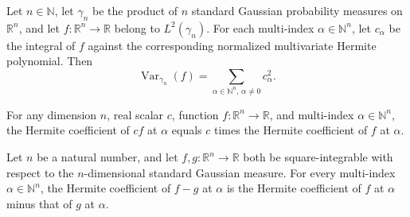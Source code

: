 \begin{theorem}
\label{BooleanAnalysis.GaussianSpace.variance_eq_hermite}
\leanok
{}
Let $n\in\mathbb N$, let $\gamma_n$ be the product of $n$ standard Gaussian probability
measures on $\mathbb R^n$, and let $f:\mathbb R^n\to\mathbb R$ belong to
$L^2(\gamma_n)$. For each multi-index $\alpha\in\mathbb N^n$, let $c_\alpha$ be the
integral of $f$ against the corresponding normalized multivariate Hermite polynomial.
Then
\[
\operatorname{Var}_{\gamma_n}(f)=\sum_{\alpha\in\mathbb N^n,\,\alpha\ne0}c_\alpha^2.
\]
\end{theorem}

\begin{lemma}
\label{BooleanAnalysis.GaussianSpace.hermiteCoeff_const_mul}
\leanok
{}
For any dimension $n$, real scalar $c$, function $f:\mathbb R^n\to\mathbb R$, and
multi-index $\alpha\in\mathbb N^n$, the Hermite coefficient of $cf$ at $\alpha$ equals
$c$ times the Hermite coefficient of $f$ at $\alpha$.
\end{lemma}

\begin{lemma}
\label{BooleanAnalysis.GaussianSpace.hermiteCoeff_sub}
\leanok
{}
Let $n$ be a natural number, and let $f,g:\mathbb R^n\to\mathbb R$ both be
square-integrable with respect to the $n$-dimensional standard Gaussian measure. For
every multi-index $\alpha\in\mathbb N^n$, the Hermite coefficient of $f-g$ at $\alpha$
is the Hermite coefficient of $f$ at $\alpha$ minus that of $g$ at $\alpha$.
\end{lemma}

